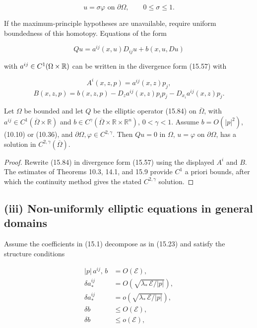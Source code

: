 \[
u=\sigma\varphi \text{ on } \partial\Omega,\qquad 0\leq \sigma \leq 1.
\]

If the maximum-principle hypotheses are unavailable, require uniform boundedness
of this homotopy. Equations of the form

\begin{equation}\tag{15.84}
Qu=a^{ij}(x,u)D_{ij}u+b(x,u,Du)
\end{equation}

with \(a^{ij}\in C^1(\Omega\times \mathbb{R})\) can be written in the divergence form (15.57) with

\[
A^i(x,z,p)=a^{ij}(x,z)p_j,
\]
\[
B(x,z,p)=b(x,z,p)-D_z a^{ij}(x,z)p_ip_j-D_{x_i}a^{ij}(x,z)p_j.
\]


\medskip

\begin{theorem}\label{gilbarg-trudinger.thm.15.12.nondivergence-existence}
Let \(\Omega\) be bounded and let \(Q\) be the elliptic operator (15.84) on
\(\overline\Omega\), with \(a^{ij}\in C^1(\overline\Omega\times\mathbb R)\) and
\(b\in C^\gamma(\overline\Omega\times\mathbb R\times\mathbb R^n)\), \(0<\gamma<1\).
Assume \(b=O(|p|^2)\), (10.10) or (10.36), and
\(\partial\Omega,\varphi\in C^{2,\gamma}\). Then \(Qu=0\) in \(\Omega\),
\(u=\varphi\) on \(\partial\Omega\), has a solution in
\(C^{2,\gamma}(\overline\Omega)\).
\end{theorem}
\begin{proof}
\sketch Rewrite (15.84) in divergence form (15.57) using the displayed
\(A^i\) and \(B\). The estimates of Theorems 10.3, 14.1, and 15.9 provide
\(C^1\) a priori bounds, after which the continuity method gives the stated
\(C^{2,\gamma}\) solution.
\end{proof}

\medskip

\subsection*{(iii) Non-uniformly elliptic equations in general domains}
Assume the coefficients in (15.1) decompose as in (15.23) and satisfy
the structure conditions

\begin{equation}\tag{15.85}
\begin{aligned}
|p|\, a^{ij},\, b &= O(\mathcal{E}), \\
\delta a^{ij}_* &= O\!\left(\sqrt{\lambda_*\,\mathcal{E}/|p|}\right), \\
\delta a_*^{ij} &= o\!\left(\sqrt{\lambda_*\,\mathcal{E}/|p|}\right), \\
\delta b &\leq O(\mathcal{E}), \\
\delta b &\leq o(\mathcal{E}),
\end{aligned}
\end{equation}

